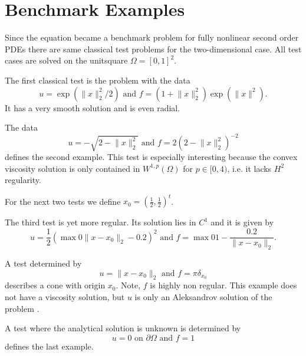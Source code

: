 \section{Benchmark Examples}

Since the \MA equation became a benchmark problem for fully nonlinear second order PDEs there are same classical test problems for the two-dimensional case. All test cases are solved on the unitsquare $\Omega=[0,1]^2$.

\begin{test} \label{test smooth}
The first classical \MA test is the problem with the data
\[
	u=\exp( \lVert x \rVert_2^2  /2) 
	\text { and } 
	f = (1 + \lVert x \rVert_2^2) \exp( \lVert x \rVert^2).
\]
It has a very smooth solution and is even radial.

\end{test}

\begin{test}\label{test sqrt}
The data
\[
	u = - \sqrt{ 2-  \lVert x \rVert_2^2}
	\text { and } 
	f = 2\left( 2-  \lVert x \rVert_2^2 \right)^{-2}
\]
defines the second example. This test is especially interesting because the convex viscosity solution is only contained in $W^{1,p}(\Omega) $ for $p \in [0,4)$\cite{DG2006a}, i.e. it lacks $H^2$ regularity.
\end{test}

For the next two tests we define $x_0 = \left(\frac 1 2, \frac 1 2  \right)^t$.

\begin{test}\label{test singularity}
The third \MA test is yet more regular. Its solution lies in $C^1$ and it is given by
\[
	u=\frac 1 2 \left( \max 0 {\lVert x - x_0 \rVert_2-0.2 }  \right)^2 
	\text { and } 
	f = \max 0 {1-\frac {0.2} {\lVert x - x_0 \rVert_2} }.
\]
\end{test}


\begin{test}\label{test dirac}
A test determined by
\[
	u = \lVert x - x_0 \rVert_2
	\text { and } 
	f = \pi \delta_{x_0}
\]
describes a cone with origin $x_0$. Note, $f$ is highly non regular. This example does not have a viscosity solution, but $u$ is only an Aleksandrov solution of the problem \cite[Section 2.3.]{FO2011}.
\end{test}


\begin{test}\label{test rhsConst}
A test where the analytical solution is unknown is determined by
\[
	u = 0 \text{ on } \partial \Omega
	\text { and } 
	f = 1
\]
defines the last example.
\end{test}

